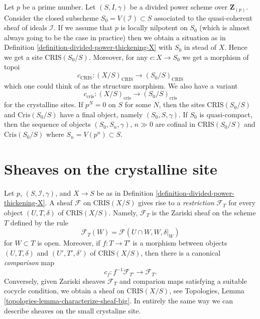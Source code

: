 \begin{remark}
\label{remark-structure-morphism}
Let $p$ be a prime number. Let $(S, I, \gamma)$ be a divided power scheme
over $\mathbf{Z}_{(p)}$. Consider the closed subscheme
$S_0 = V(\mathcal{I}) \subset S$ associated to the quasi-coherent sheaf
of ideals $\mathcal{I}$. If we assume that $p$ is locally nilpotent on
$S_0$ (which is almost always going to be the case in practice) then
we obtain a situation as in
Definition \ref{definition-divided-power-thickening-X} with $S_0$ in stead
of $X$. Hence we get a site $\text{CRIS}(S_0/S)$. Moreover, for any
$c : X \to S_0$ we get a morphism of topoi
$$
c_{\text{CRIS}} : (X/S)_{\text{CRIS}} \longrightarrow (S_0/S)_{\text{CRIS}}
$$
which one could think of as the structure morphism. We also have a variant
$$
c_{\text{cris}} : (X/S)_{\text{cris}} \longrightarrow (S_0/S)_{\text{cris}}
$$
for the crystalline sites. If $p^N = 0$ on $S$ for some $N$, then
the sites $\text{CRIS}(S_0/S)$ and $\text{Cris}(S_0/S)$ have a final
object, namely $(S_0, S, \gamma)$. If $S_0$ is quasi-compact, then
the sequence of objects $(S_0, S_n, \gamma)$, $n \gg 0$ are cofinal in
$\text{CRIS}(S_0/S)$ and $\text{Cris}(S_0/S)$ where $S_n = V(p^n) \subset S$.
\end{remark}




\section{Sheaves on the crystalline site}
\label{section-sheaves}

\noindent
Let $p$, $(S, \mathcal{I}, \gamma)$, and $X \to S$ be as in
Definition \ref{definition-divided-power-thickening-X}.
A sheaf $\mathcal{F}$ on $\text{CRIS}(X/S)$ gives rise to
a {\it restriction} $\mathcal{F}_T$ for every object $(U, T, \delta)$
of $\text{CRIS}(X/S)$. Namely, $\mathcal{F}_T$ is the Zariski sheaf on
the scheme $T$ defined by the rule
$$
\mathcal{F}_T(W) = \mathcal{F}(U \cap W, W, \delta|_W)
$$
for $W \subset T$ is open.
Moreover, if $f : T \to T'$ is a morphism between objects
$(U, T, \delta)$ and $(U', T', \delta')$ of $\text{CRIS}(X/S)$, then there
is a canonical {\it comparison} map
\begin{equation}
\label{equation-comparison}
c_f : f^{-1}\mathcal{F}_{T'} \longrightarrow \mathcal{F}_T.
\end{equation}
Conversely, given Zariski sheaves $\mathcal{F}_T$ and comparion maps
satisfying a suitable cocycle condition, we obtain a sheaf on
$\text{CRIS}(X/S)$, see
Topologies, Lemma \ref{topologies-lemma-characterize-sheaf-big}.
In entirely the same way we can describe sheaves on the
small crystaline site.


